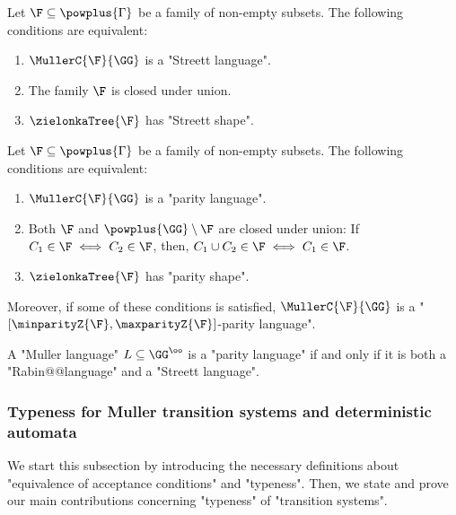 \documentclass{theoretics}
\begin{document}
\begin{proposition}\label{prop-typ:StreettZielonkaShape}
	Let $\F\subseteq \powplus{\Gamma}$ be a family of non-empty subsets. The following conditions are equivalent:
	\begin{enumerate}
		\item $\MullerC{\F}{\GG}$ is a "Streett language".
		\item The family $\F$ is closed under union.
		\item $\zielonkaTree{\F}$ has "Streett shape". 
	\end{enumerate}
	
\end{proposition}

\begin{proposition}\label{prop-typ:parityZielonkaShape}
	Let $\F\subseteq \powplus{\Gamma}$ be a family of non-empty subsets. The following conditions are equivalent:
	\begin{enumerate}
		\item $\MullerC{\F}{\GG}$ is a "parity language".
		\item Both $\F$ and $\powplus{\GG}\setminus \F$ are closed under union: If %
		$C_1\in \F \iff C_2\in \F$, then, $C_1\cup C_2\in \F \iff C_1\in \F$.
		\item $\zielonkaTree{\F}$ has "parity shape". 
	\end{enumerate}
	Moreover, if some of these conditions is satisfied, $\MullerC{\F}{\GG}$ is a "$[\minparityZ{\F},\maxparityZ{\F}]$-parity language".
\end{proposition}

\begin{corollary}
	A "Muller language" $L \subseteq \GG^\oo$ is a "parity language" if and only if it is both a "Rabin@@language" and  a "Streett language".
\end{corollary}




\subsubsection{Typeness for  Muller transition systems and deterministic automata}\label{subsubsec-typeness:Typeness_TS}
We start this subsection by introducing the necessary definitions about "equivalence of acceptance conditions" and "typeness". Then, we state and prove our main contributions concerning "typeness" of "transition systems".
\end{document}

